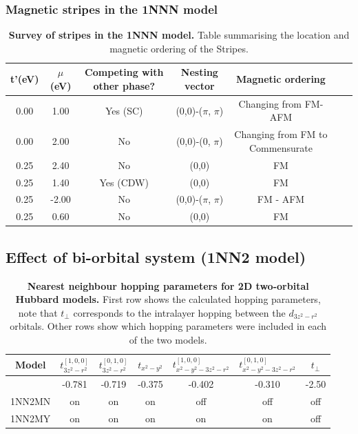 \documentclass[12pt]{article}
\begin{document}
\subsubsection{Magnetic stripes in the 1NNN model}

\begin{table}[h]
    \centering
    \begin{tabular}{|c|c|c|c|c|c|c|}
        \hline
       t'(eV) & $\mu$ (eV) & Competing with other phase?& Nesting vector & Magnetic ordering  \\
        \hline
        0.00 & 1.00 & Yes (SC) & (0,0)-($\pi$, $\pi$)&  Changing from FM-AFM\\
        \hline
        0.00 & 2.00 &  No  & (0,0)-(0, $\pi$)  & Changing from FM to Commensurate\\
        \hline
        0.25 & 2.40 &  No  & (0,0)  & FM \\
        \hline
        0.25 & 1.40 &  Yes (CDW)  & (0,0)  & FM \\
        \hline
        0.25 & -2.00 & No  & (0,0)-($\pi$, $\pi$)  & FM - AFM\\
        \hline
        0.25 & 0.60 &  No  & (0,0)  & FM \\
          
        \hline
    \end{tabular}
    \caption{\textbf{Survey of stripes in the 1NNN model.} Table summarising the location and magnetic ordering of the Stripes.}
    \label{tab:StripesSummary}
\end{table}

\subsection{Effect of bi-orbital system (1NN2 model)}
\label{subsec:1NN2Model}

\begin{table}[h]
    \centering
    \begin{tabular}{|c|c|c|c|c|c|c|}
        \hline
       Model &$t^{[1,0,0]}_{3z^2-r^2}$  &$t^{[0,1,0]}_{3z^2-r^2}$  &  $t_{x^2 - y^2}$ &  $t^{[1,0,0]}_{x^2 - y^2 -3z^2-r^2} $ & $t^{[0,1,0]}_{x^2 - y^2 -3z^2-r^2} $ & $t_{\perp}$ \\
        \hline
        & -0.781 & -0.719  &  -0.375 & -0.402 & -0.310 & -2.50\\
        \hline
        1NN2MN & on &  on  & on  & off & off & off \\
        \hline
        1NN2MY & on &  on  & on  & on & on & off \\
          
        \hline
    \end{tabular}
    \caption{\textbf{Nearest neighbour hopping parameters for 2D  two-orbital Hubbard models.} First row shows the calculated hopping parameters, note that  $t_{\perp}$ corresponds to the intralayer hopping between the $d_{3z^2-r^2}$ orbitals. Other rows show which hopping parameters were included in each of the two models.}
    \label{tab:2D2orbparams }
\end{table}
\end{document}
